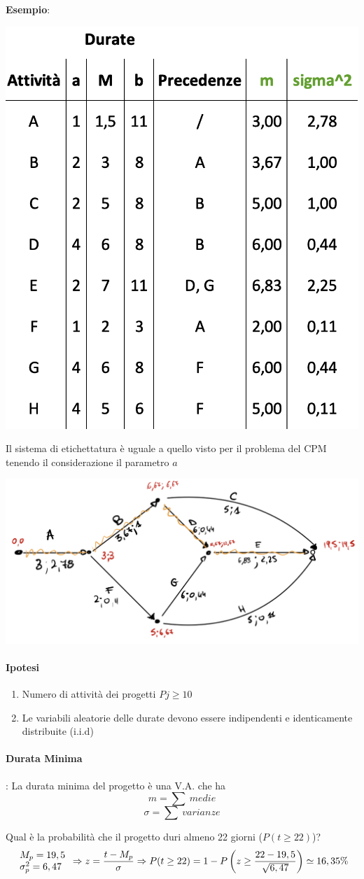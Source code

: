 \documentclass[12pt,a4paper]{article}
\begin{document}
\textbf{Esempio}:
\begin{center}
\includegraphics[width=0.4\columnwidth]{img/pert_es.png}
\end{center}
Il sistema di etichettatura è uguale a quello visto per il problema del CPM tenendo il considerazione il parametro $a$
\begin{center}
\includegraphics[width=0.6\columnwidth]{img/pert_es_grafo.jpeg}
\end{center}

\paragraph{Ipotesi}
\begin{enumerate}
\item Numero di attività dei progetti $Pj \geq 10$
\item Le variabili aleatorie delle durate devono essere indipendenti e identicamente distribuite (i.i.d)
\end{enumerate}

\paragraph{Durata Minima}: La durata minima del progetto è una V.A. che ha
$$m = \sum \ medie$$
$$\sigma = \sum \ varianze$$

\noindent
Qual è la probabilità che il progetto duri almeno 22 giorni ($P(t\geq 22)$)?\\
\begin{equation*}
\begin{array}{l}
M_p = 19,5\\
\sigma^2_p = 6,47
\end{array} \Rightarrow z = {t - M_p \over \sigma} \Rightarrow P(t \geq 22) = 1 - P\left(z \geq {22 - 19,5 \over \sqrt{6,47}}\right) \simeq 16,35\%
\end{equation*}
\end{document}
